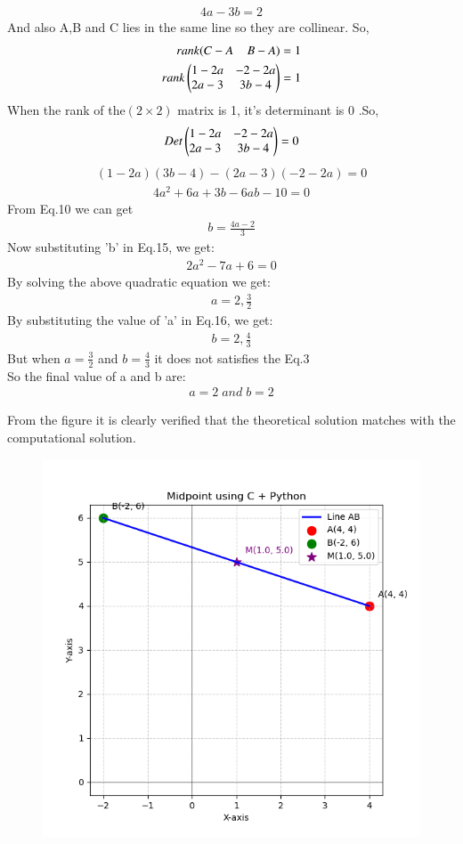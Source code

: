 \documentclass[journal]{IEEEtran}
\theoremstyle{remark}
\begin{document}
\begin{align}
    4a-3b=2
\end{align}
And also A,B and C lies in the same line so they are collinear. So,
\begin{align}
   rank(C-A\;\;\;\;B-A )=1\\
   rank\begin{pmatrix}1-2a&-2-2a\\
   2a-3&3b-4\end{pmatrix}=1
\end{align}
When  the rank of the$(2\times2)$ matrix is 1, it's determinant is 0 .So,
\begin{align}
   Det\begin{pmatrix}1-2a&-2-2a\\2a-3&3b-4\end{pmatrix}=0
\end{align}
\begin{align}
    (1-2a)(3b-4)-(2a-3)(-2-2a)=0
\end{align}
\begin{align}
    4a^2+6a+3b-6ab-10=0
\end{align}
From Eq.10 we can get
\begin{align}
    b=\frac{4a-2}{3}
\end{align}
Now substituting 'b' in Eq.15, we get:
\begin{align}
2a^2-7a+6=0
\end{align}
By solving the above quadratic equation we get:
\begin{align}
a=2,\frac{3}{2}
\end{align}
By substituting the value of 'a' in Eq.16, we get:
\begin{align}
b=2,\frac{4}{3}
\end{align}
But when $a=\frac{3}{2}$ and $b=\frac{4}{3}$ it does not satisfies the Eq.3\\
So the final value of a and b are:
\begin{align}
    a=2\;and\;b=2
\end{align}


From the figure it is clearly verified that the theoretical solution matches with the computational solution.\\
\begin{figure}[h]
    \centering
    \includegraphics[height=0.5\textheight, keepaspectratio]{figs/figure1.png}
    \label{figure_1}
\end{figure}
\end{document}
